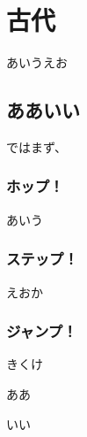 \documentclass[head_space=20mm,foot_space=20mm,gutter=10mm,line_length=190mm]{jlreq}
\newcommand{\hop}[0]{\subsubsection*{ホップ！}}
\newcommand{\step}[0]{\subsubsection*{ステップ！}}
\newcommand{\jump}[0]{\subsubsection*{ジャンプ！}}
\begin{document}
\maketitle
\tableofcontents
\clearpage
\section{古代}
あいうえお
\subsection{ああいい}
ではまず、
\hop
あいう
\step
えおか
\jump
きくけ

\clearpage
\begin{thebibliography}{99}
\item ああ
\item いい
\end{thebibliography}
\end{document}
